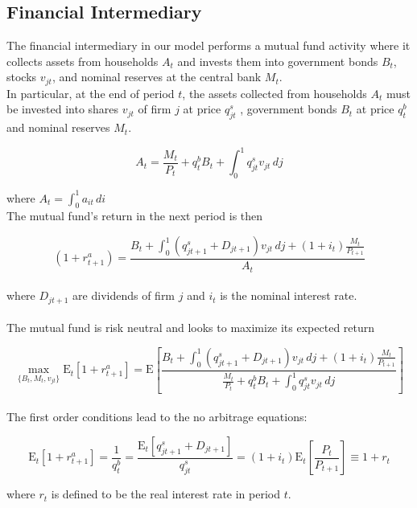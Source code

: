 \documentclass[titlepage]{\econtex}\providecommand{\texname}{BufferStockTheory}
\begin{document}
\subsection{Financial Intermediary}

\label{subsec:Financial Intermediary}

The financial intermediary in our model performs a mutual fund activity where it  collects assets from households $A_{t}$ and invests them into government bonds $B_{t}$, stocks $v_{jt}$, and nominal reserves at the central bank $M_{t}$.\\ 

In particular, at the end of period $t$, the assets collected from households $A_{t}$ must be invested into shares $\mathit{v}_{jt}$ of firm $j$ at price  $q^{s}_{jt}$ , government bonds $B_{t}$ at price $q^{b}_{t}$ and nominal reserves $M_{t}$. 

$$A_{t} = \frac{M_{t}}{P_{t}} +q^{b}_{t} B_{t} + \int_{0}^{1} q^{s}_{jt}\mathit{v}_{jt}\,dj$$

where $A_{t} = \int_{0}^{1} a_{it} \, di$ \\

The mutual fund's return in the next period is then 

$$(1+r^{a}_{t+1})  = \frac{  B_{t} + \int_{0}^{1} (q^{s}_{jt+1}+ D_{jt+1})\mathit{v}_{jt} \, dj +(1+i_{t}) \frac{M_{t}}{P_{t+1}}}{A_{t}}$$\\ 

where  $D_{jt+1}$ are dividends of firm $j$ and $i_{t}$ is the nominal interest rate. \\ \\

The mutual fund is risk neutral and looks to maximize its expected return 


$$\max_{\{B_{t}, M_{t} , \mathit{v}_{jt} \}} \mathrm{E}_{t}\left[1+r^{a}_{t+1} \right] = \mathrm{E}\left[ \frac{ B_{t} + \int_{0}^{1} (q^{s}_{jt+1}+ D_{jt+1})\mathit{v}_{jt} \, dj +(1+i_{t}) \frac{M_{t}}{P_{t+1}}}{\frac{M_{t}}{P_{t}} +q^{b}_{t} B_{t} + \int_{0}^{1} q^{s}_{jt}\mathit{v}_{jt}\,dj} \right]$$ \\

 
The first order conditions lead to the no arbitrage equations:

$$ \mathrm{E}_{t}\left[1+r^{a}_{t+1}\right]= \frac{1}{q^{b}_{t}}  =\frac{\mathrm{E}_{t}\left[q^{s}_{jt+1} + D_{jt+1} \right]}{q^{s}_{jt}} = (1+i_{t}) \mathrm{E}_{t}\left[\frac{P_{t}}{P_{t+1}}\right] \equiv 1 +r_{t}$$

where $r_{t}$ is defined to be the real interest rate in period $t$.  \\ \\
\end{document}
